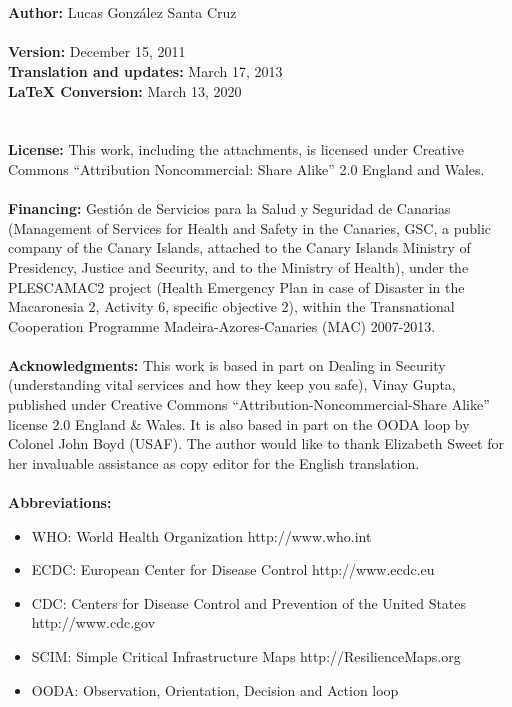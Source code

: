 \documentclass[12pt, a4]{scrartcl}
\begin{document}
\newpage
\\
\\
\textbf{Author:} Lucas González Santa Cruz
\\
\\
\textbf{Version:} December 15, 2011 \\
\textbf{Translation and updates:} March 17, 2013\\
\textbf{LaTeX Conversion:} March 13, 2020\\
\\
\\
\textbf{License:} This work, including the attachments, is licensed under Creative Commons “Attribution Noncommercial: Share Alike” 2.0 England and Wales. 
\\
\\
\textbf{Financing:} Gestión de Servicios para la Salud y Seguridad de Canarias (Management of Services for Health and Safety in the Canaries, GSC, a public company of the Canary Islands, attached to the Canary Islands Ministry of Presidency, Justice and Security, and to the Ministry of Health), under the PLESCAMAC2 project (Health Emergency Plan in case of Disaster in the Macaronesia 2, Activity 6, specific objective 2), within the Transnational Cooperation Programme Madeira-Azores-Canaries (MAC) 2007-2013.
\\
\\
\textbf{Acknowledgments:} This work is based in part on Dealing in Security (understanding vital services and how they keep you safe), Vinay Gupta, published under Creative Commons “Attribution-Noncommercial-Share Alike” license 2.0 England \& Wales. It is also based in part on the OODA loop by Colonel John Boyd (USAF). The author would like to thank Elizabeth Sweet for her invaluable assistance as copy editor for the English translation.
\\
\\
\textbf{Abbreviations:}
\begin{itemize}
	\item WHO: World Health Organization http://www.who.int
	\item ECDC: European Center for Disease Control http://www.ecdc.eu
	\item CDC: Centers for Disease Control and Prevention of the United States http://www.cdc.gov
	\item SCIM: Simple Critical Infrastructure Maps http://ResilienceMaps.org
	\item OODA: Observation, Orientation, Decision and Action loop
\end{itemize}
\newpage
\end{document}
